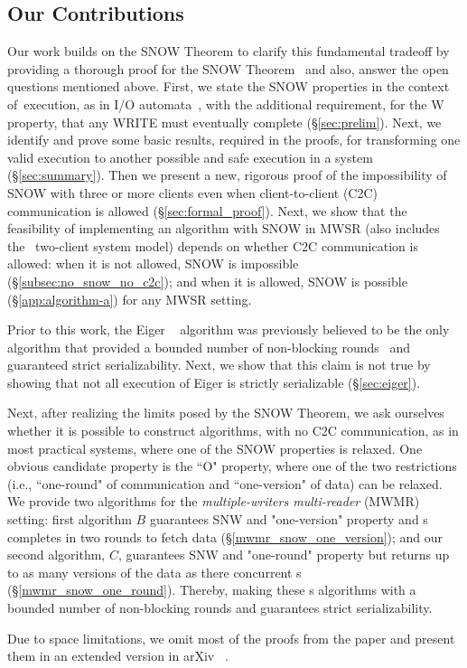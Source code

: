 \subsection{Our Contributions}
{\color{blue}
Our work builds on the SNOW Theorem to clarify this fundamental tradeoff by providing a thorough proof for the SNOW Theorem~\cite{SNOW2016} and also, answer the open questions mentioned above. First, we state the SNOW properties in the context of execution, as in I/O automata~\cite{Lynch1996}, with the additional requirement, for the W property, that any WRITE must eventually complete (\S\ref{sec:prelim}). Next, we identify and prove some basic results, required in the proofs, for transforming one valid execution to another possible and safe execution in a \rot{} system (\S\ref{sec:summary}). 
Then we present a new, rigorous proof of the impossibility of SNOW with three or more clients even when client-to-client (C2C) communication is allowed (\S\ref{sec:formal_proof}).
Next, we show that the feasibility of implementing an algorithm with SNOW in MWSR (also includes the  two-client system model) depends on whether C2C communication is allowed:
when it is not allowed, SNOW is impossible (\S\ref{subsec:no_snow_no_c2c}); and when it is allowed, SNOW is possible (\S\ref{app:algorithm-a}) for any MWSR setting.

Prior to this work, the Eiger ~\cite{Lloyd:nsdi2013} algorithm was previously believed to be the only algorithm that provided a bounded number of non-blocking rounds~\cite{Lloyd:nsdi2013} and guaranteed strict serializability. 
Next, we show that this claim is not true by showing that not all execution of Eiger is strictly serializable (\S\ref{sec:eiger}).

Next, after realizing the limits posed by the SNOW Theorem, we ask ourselves whether it is possible to construct \rot{} algorithms, with no C2C communication, as in most practical systems, where one of the SNOW properties is relaxed. One obvious candidate property is the ``O" property, where one of the two restrictions (i.e., ``one-round" of communication and ``one-version" of data) can be relaxed. We provide two algorithms for the \emph{multiple-writers multi-reader} (MWMR) setting: first algorithm $B$ guarantees SNW and "one-version" property and \rot{}s completes in two rounds to fetch data (\S\ref{mwmr_snow_one_version}); and 
our second algorithm, $C$, guarantees SNW and "one-round" property but returns up to as many versions of the data as there concurrent \wot{}s
(\S\ref{mwmr_snow_one_round}). Thereby, making these \rot{}s algorithms with a bounded number of non-blocking rounds and guarantees strict serializability. 

Due to space limitations, we omit most of the proofs from the paper and present them in an extended version in arXiv ~\cite{konwar2018snow}.
}


